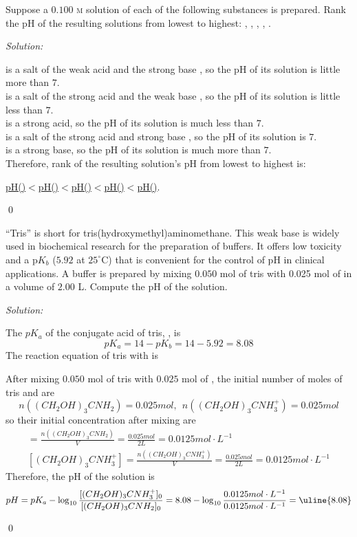 \documentclass[12pt]{article}
\newenvironment{problem}[2][Problem]{\begin{trivlist}
\item[\hskip \labelsep {\bfseries #1}\hskip \labelsep {\bfseries #2.}]}{\end{trivlist}}
\newenvironment{sol}
    {\emph{Solution:}
    }
    {
    \qed
    }
\begin{document}
\begin{problem}{15.42}
Suppose a $0.100$ \textsc{m} solution of each of the following substances is prepared. Rank the pH of the resulting solutions from lowest to highest: , , , , .
\end{problem}
\begin{sol}
 is a salt of the weak acid  and the strong base , so the pH of its solution is little more than $7$.\\
 is a salt of the strong acid  and the weak base , so the pH of its solution is little less than $7$.\\
 is a strong acid, so the pH of its solution is much less than $7$.\\
 is a salt of the strong acid  and strong base , so the pH of its solution is $7$.\\
 is a strong base, so the pH of its solution is much more than $7$.\\
Therefore, rank of the resulting solution's pH from lowest to highest is:
\begin{center}
\uline{pH()$<$pH()$<$pH()$<$pH()$<$pH()}.
\end{center}
\end{sol}

\begin{problem}{15.43}
“Tris” is short for tris(hydroxymethyl)aminomethane. This weak base is widely used in biochemical research for the preparation of buffers. It offers low toxicity and a p$K_b$ ($5.92$ at $25 ^{\circ}$C) that is convenient for the control of pH in clinical applications. A buffer is prepared by mixing $0.050$ mol of tris with 0.025 mol of  in a volume of $2.00$ L. Compute the pH of the solution.
\end{problem}
\begin{sol}
The $pK_a$ of the conjugate acid of tris, , is
\[
pK_a=14-pK_b=14-5.92=8.08
\]
The reaction equation of tris with  is
\begin{center}
\end{center}
After mixing $0.050$ mol of tris with $0.025$ mol of , the initial number of moles of tris and  are
\[
n((CH_2OH)_3CNH_2)=0.025mol,~~n((CH_2OH)_3CNH_3^+)=0.025mol
\]
so their initial concentration after mixing are
\begin{gather*}
[(CH_2OH)_3CNH_2]=\frac{n((CH_2OH)_3CNH_2)}{V}=\frac{0.025mol}{2L}=0.0125mol\cdot L^{-1}\\
[(CH_2OH)_3CNH_3^+]=\frac{n((CH_2OH)_3CNH_3^+)}{V}=\frac{0.025mol}{2L}=0.0125mol\cdot L^{-1}
\end{gather*}
Therefore, the pH of the solution is
\[
pH=pK_a-\log_{10}\frac{[(CH_2OH)_3CNH_3^+]_0}{[(CH_2OH)_3CNH_2]_0}=8.08-\log_{10}\frac{0.0125mol\cdot L^{-1}}{0.0125mol\cdot L^{-1}}=\uline{8.08}
\]
\end{sol}
\end{document}
